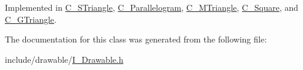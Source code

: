 Implemented in \hyperlink{classC__STriangle_ad003b932a467de60b814d897fda38390}{C\+\_\+\+S\+Triangle}, \hyperlink{classC__Parallelogram_a044ce6d1042ea93589a38f4686489862}{C\+\_\+\+Parallelogram}, \hyperlink{classC__MTriangle_a049e6026145865387db4244678336784}{C\+\_\+\+M\+Triangle}, \hyperlink{classC__Square_a47a80c25bbeda17f17a8230127b4a5ed}{C\+\_\+\+Square}, and \hyperlink{classC__GTriangle_a9cfd20cb1d19e6c92bd217c470c86405}{C\+\_\+\+G\+Triangle}.



The documentation for this class was generated from the following file\+:\begin{DoxyCompactItemize}
\item 
include/drawable/\hyperlink{I__Drawable_8h}{I\+\_\+\+Drawable.\+h}\end{DoxyCompactItemize}
